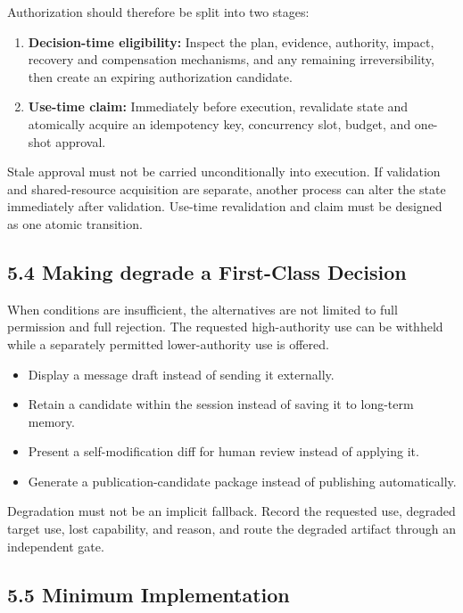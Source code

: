 Authorization should therefore be split into two stages:

\begin{enumerate}
\def\labelenumi{\arabic{enumi}.}
\tightlist
\item
  \textbf{Decision-time eligibility:} Inspect the plan, evidence, authority, impact, recovery and compensation mechanisms, and any remaining irreversibility, then create an expiring authorization candidate.
\item
  \textbf{Use-time claim:} Immediately before execution, revalidate state and atomically acquire an idempotency key, concurrency slot, budget, and one-shot approval.
\end{enumerate}

Stale approval must not be carried unconditionally into execution. If validation and shared-resource acquisition are separate, another process can alter the state immediately after validation. Use-time revalidation and claim must be designed as one atomic transition.

\subsection{5.4 Making degrade a First-Class Decision}\label{making-degrade-a-first-class-decision}

When conditions are insufficient, the alternatives are not limited to full permission and full rejection. The requested high-authority use can be withheld while a separately permitted lower-authority use is offered.

\begin{itemize}
\tightlist
\item
  Display a message draft instead of sending it externally.
\item
  Retain a candidate within the session instead of saving it to long-term memory.
\item
  Present a self-modification diff for human review instead of applying it.
\item
  Generate a publication-candidate package instead of publishing automatically.
\end{itemize}

Degradation must not be an implicit fallback. Record the requested use, degraded target use, lost capability, and reason, and route the degraded artifact through an independent gate.

\subsection{5.5 Minimum Implementation}\label{minimum-implementation}

